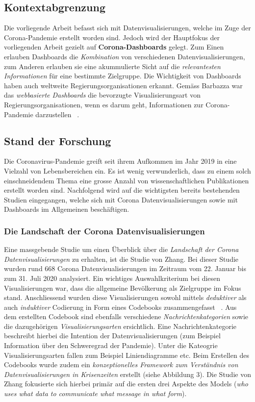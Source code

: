 \documentclass[12pt, oneside]{article}
\begin{document}
\subsection{Kontextabgrenzung}
Die vorliegende Arbeit befasst sich mit Datenvisualisierungen, welche im Zuge der Corona-Pandemie erstellt worden sind. Jedoch wird der Hauptfokus der vorliegenden Arbeit gezielt auf \textbf{Corona-Dashboards} gelegt. Zum Einen erlauben Dashboards die \textit{Kombination} von verschiedenen Datenvisualisierungen, zum Anderen erlauben sie eine akummulierte Sicht auf die \textit{relevantesten Informationen} für eine bestimmte Zielgruppe. Die Wichtigkeit von Dashboards haben auch weltweite Regierungsorganisationen erkannt. Gemäss Barbazza war das \textit{webbasierte Dashboards} die bevorzugte Visualisierungsart von Regierungsorganisationen, wenn es darum geht, Informationen zur Corona-Pandemie darzustellen ~\citep{Barbazza.}.

\subsection{Stand der Forschung}
 Die Coronavirus-Pandemie greift seit ihrem Aufkommen im Jahr 2019 in eine Vielzahl von Lebensbereichen ein. Es ist wenig verwunderlich, dass zu einem solch einschneidendem Thema eine grosse Anzahl von wissenschaftlichen Publikationen erstellt worden sind. Nachfolgend wird auf die wichtigsten bereits bestehenden Studien eingegangen, welche sich mit Corona Datenvisualisierungen sowie mit Dashboards im Allgemeinen beschäftigen.
 
 \subsubsection{Die Landschaft der Corona Datenvisualisierungen}
 Eine massgebende Studie um einen Überblick über die \textit{Landschaft der Corona Datenvisualisierungen} zu erhalten, ist die Studie von Zhang. Bei dieser Studie wurden rund 668 Corona Datenvisualisierungen im Zeitraum vom 22. Januar bis zum 31. Juli 2020 analysiert. Ein wichtiges Auswahlkriterium bei diesen Visualisierungen war, dass die allgemeine Bevölkerung als Zielgruppe im Fokus stand. Anschliessend wurden diese Visualisierungen sowohl mittels \textit{deduktiver} als auch \textit{induktiver} Codierung in Form eines Codebooks zusammengefasst ~\citep[S. 3]{YixuanZhang.}. Aus dem erstellten Codebook sind ebenfalls verschiedene \textit{Nachrichtenkategorien} sowie die dazugehörigen \textit{Visualisierungsarten} ersichtlich. Eine Nachrichtenkategorie beschreibt hierbei die Intention der Datenvisualisierungen (zum Beispiel Information über den Schweregrad der Pandemie). Unter die Kateogrie Visualisierungsarten fallen zum Beispiel Liniendiagramme etc. Beim Erstellen des Codebooks wurde zudem ein \textit{konzeptionelles Framework zum Verständnis von Datenvisualisierungen in Krisenzeiten} erstellt (siehe Abbildung 3). Die Studie von Zhang fokusierte sich hierbei primär auf die ersten drei Aspekte des Models (\textit{who uses what data to communicate what message in what form}). 
 
\end{document}
